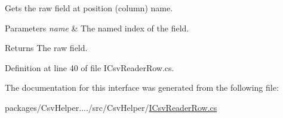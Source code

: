 Gets the raw field at position (column) name. 


\begin{DoxyParams}{Parameters}
{\em name} & The named index of the field.\\
\hline
\end{DoxyParams}
\begin{DoxyReturn}{Returns}
The raw field.
\end{DoxyReturn}


Definition at line 40 of file I\-Csv\-Reader\-Row.\-cs.



The documentation for this interface was generated from the following file\-:\begin{DoxyCompactItemize}
\item 
packages/\-Csv\-Helper..../src/\-Csv\-Helper/\hyperlink{a00251}{I\-Csv\-Reader\-Row.\-cs}\end{DoxyCompactItemize}
